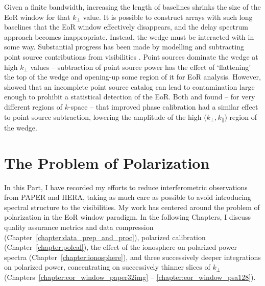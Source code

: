 Given a finite bandwidth, increasing the length of baselines shrinks the size of the EoR window for that $k_{\perp}$ value. It is possible to construct arrays with such long baselines that the EoR window effectively disappears, and the delay spectrum approach becomes inappropriate. Instead, the wedge must be interacted with in some way. Substantial progress has been made by modelling and subtracting point source contributions from visibilities \citep[e.g.][]{Patil.17}. Point sources dominate the wedge at high $k_{\perp}$ values \citep[e.g.][]{Trott.12} -- subtraction of point source power has the effect of `flattening' the top of the wedge and opening-up some region of it for EoR analysis. However, \cite{Barry.16} showed that an incomplete point source catalog can lead to contamination large enough to prohibit a statistical detection of the EoR.
Both \cite{Kohn.16} and \cite{Patil.17} found -- for very different regions of $k$-space -- that improved phase calibration had a similar effect to point source subtraction, lowering the amplitude of the high ($k_{\perp},k_{\parallel}$) region of the wedge.

\section{The Problem of Polarization}
\label{sec:eor_window_problem_of_pol}



In this Part, I have recorded my efforts to reduce interferometric observations from PAPER and HERA, taking as much care as possible to avoid introducing spectral structure to the visibilities. My work has centered around the problem of polarization in the EoR window paradigm. In the following Chapters, I discuss quality assurance metrics and data compression (Chapter~\ref{chapter:data_prep_and_proc}), polarized calibration (Chapter~\ref{chapter:polcal}), the effect of the ionosphere on polarized power spectra (Chapter~\ref{chapter:ionosphere}), and three successively deeper integrations on polarized power, concentrating on successively thinner slices of $k_{\perp}$ (Chapters~\ref{chapter:eor_window_paper32img} -- \ref{chapter:eor_window_psa128}).